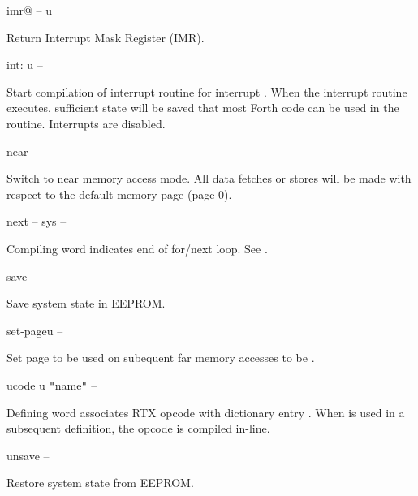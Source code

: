 \begin{gloss}{imr@}{ -- u }

Return Interrupt Mask Register (IMR).
\end{gloss}
\begin{gloss}{int:}{ u -- }

Start compilation of interrupt routine for interrupt .
When the interrupt routine executes, sufficient state will be saved
that most Forth code can be used in the routine.  Interrupts are
disabled.
\end{gloss}
\begin{gloss}{near}{ -- }

Switch to near memory access mode.  All data fetches or stores will be
made with respect to the default memory page (page 0).
\end{gloss}
\begin{cgloss}{next}{ -- }{ sys -- }

Compiling word indicates end of for/next loop.  See .
\end{cgloss}
\begin{gloss}{save}{ -- }

Save system state in EEPROM.
\end{gloss}
\begin{gloss}{set-page}{u -- }

Set page to be used on subequent far memory accesses to be .
\end{gloss}
\begin{gloss}{ucode}{ u \verb|"|name\verb|"| -- }

Defining word associates RTX opcode  with dictionary entry
.  When  is used in a subsequent definition,
the opcode  is compiled in-line.
\end{gloss}
\begin{gloss}{unsave}{ -- }

Restore system state from EEPROM.
\end{gloss}
